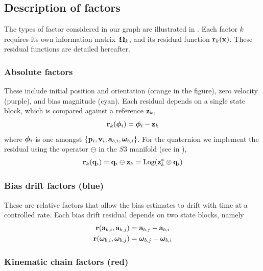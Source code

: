 \subsection{Description of factors}

The types of factor considered in our graph are illustrated in . 
Each factor $k$ requires its own information matrix~${\bm \Omega}_k$, and its residual function ${\bf r}_k({\bf x})$. These residual functions are detailed hereafter.

\subsubsection{Absolute factors}

These include initial position and orientation (orange in the figure), zero velocity (purple), and bias magnitude (cyan). Each residual depends on a single state block, which is compared against a reference ${\bf z}_k$,
%
\begin{align}
{\bf r}_k({\bm \phi}_i) = {\bm \phi}_i - {\bf z}_k
\end{align}
%
where ${\bm \phi}_i$ is one amongst $\{{\bf p}_i,{\bf v}_i,{\bf a}_{b,i},{{\bm \omega}}_{b,i}\}$. 
For the quaternion we implement the residual using the operator $\ominus$ in the $S3$ manifold (see  in ),
%
\begin{align}
{\bf r}_k({\bf q}_i) = {\bf q}_i\ominus{\bf z}_k = \operatorname*{Log}({\bf z}_k^*\otimes{\bf q}_i)
\end{align}
%

\subsubsection{Bias drift factors (blue)}

These are relative factors that allow the bias estimates to drift with time at a controlled rate. Each bias drift residual depends on two state blocks, namely
%
\begin{align}
\begin{split}
{\bf r}({\bf a}_{b,i}, {\bf a}_{b,j}) &= {\bf a}_{b,j} - {\bf a}_{b,i} 
\\
{\bf r}({{\bm \omega}}_{b,i} , {{\bm \omega}}_{b,j})  &= {{\bm \omega}}_{b,j}  - {{\bm \omega}}_{b,i}
\end{split}
\end{align}

\subsubsection{Kinematic chain factors (red)}

